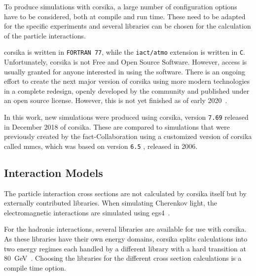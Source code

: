 To produce simulations with \gls{corsika}, a large number of configuration options
have to be considered, both at compile and run time.
These need to be adapted for the specific experiments and several libraries
can be chosen for the calculation of the particle interactions.

\gls{corsika} is written in \texttt{FORTRAN 77},
while the \texttt{iact/atmo} extension is written in \texttt{C}.
Unfortunately, \gls{corsika} is not Free and Open Source Software.
However, access is usually granted for anyone interested in using the software.
There is an ongoing effort to create the next major version of \gls{corsika} 
using more modern technologies in a complete redesign,
openly developed by the community and published under an open source license.
However, this is not yet finished as of early 2020~\cite{corsika8}.

In this work, new simulations were produced using \gls{corsika}, version \texttt{7.69} released in December 2018 of \gls{corsika}.
These are compared to simulations that were previously created 
by the \gls{fact}-Collaboration
using a customized version of \gls{corsika} called \gls{mmcs}, which
was based on version \texttt{6.5} \cite{mmcs}, released in 2006.

\subsection{Interaction Models}\label{sec:models}

The particle interaction cross sections are not calculated by \gls{corsika} itself
but by externally contributed libraries.
When simulating Cherenkov light, 
the electromagnetic interactions are simulated using \gls{egs4}~\cite{egs4}.

For the hadronic interactions, several libraries are available for use
with \gls{corsika}.
As these libraries have their own energy domains, \gls{corsika} splits 
calculations into two energy regimes each handled by a different library with
a hard transition at \SI{80}{\GeV}~\cite{corsika_manual_769}.
Choosing the libraries for the different cross section calculations is a compile time option.

